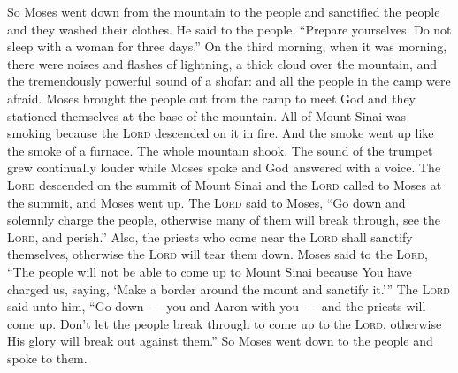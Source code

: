 \begin{inparaenum}
     So Moses went down from the mountain to the people and sanctified the people and they washed their clothes.%
     He said to the people, ``Prepare yourselves. Do not sleep with a woman for three days.''%
     On the third morning, when it was morning, there were noises and flashes of lightning, a thick cloud over the mountain, and the tremendously powerful sound of a shofar: and all the people in the camp were afraid.%
     Moses brought the people out from the camp to meet God and they stationed themselves at the base of the mountain.%
     All of Mount Sinai was smoking because the \textsc{Lord} descended on it in fire. And the smoke went up like the smoke of a furnace. The whole mountain shook.%
     The sound of the trumpet grew continually louder while Moses spoke and God answered with a voice.%
     The \textsc{Lord} descended on the summit of Mount Sinai and the \textsc{Lord} called to Moses at the summit, and Moses went up.%
     The \textsc{Lord} said to Moses, ``Go down and solemnly charge the people, otherwise many of them will break through, see the \textsc{Lord}, and perish.''%
     Also, the priests who come near the \textsc{Lord} shall sanctify themselves, otherwise the \textsc{Lord} will tear them down.%
     Moses said to the \textsc{Lord}, ``The people will not be able to come up to Mount Sinai because You have charged us, saying, `Make a border around the mount and sanctify it.'\thinspace''%
     The \textsc{Lord} said unto him, ``Go down~--- you and Aaron with you~--- and the priests will come up. Don't let the people break through to come up to the \textsc{Lord}, otherwise His glory will break out against them.''%
     So Moses went down to the people and spoke to them.%
\end{inparaenum}
